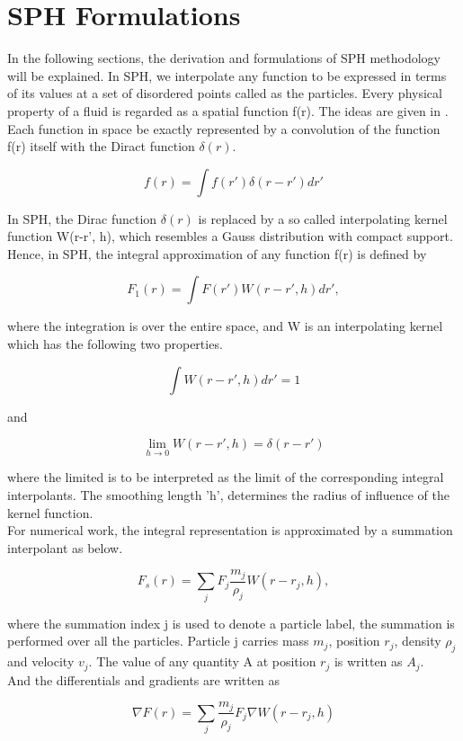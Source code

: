 
\chapter{SPH Formulations}

In the following sections, the derivation and formulations of SPH methodology will be explained. In SPH, we interpolate any function to be expressed in terms of its values at a set of disordered points called as the particles. Every physical property of a fluid is regarded as a spatial function f(r). The ideas are given in \cite{Monaghan1977}. Each function in space be exactly represented by a convolution of the function f(r) itself with the Diract function $\delta (r)$.

\begin{equation}
 f(r) = \int f(r')\delta(r - r')dr'
\end{equation}

In SPH, the Dirac function $\delta (r)$ is replaced by a so called interpolating kernel function W(r-r', h), which resembles a Gauss distribution with compact support. Hence, in SPH, the integral approximation of any function f(r) is defined by

\begin{equation}
 F_1 (r) = \int F(r') W(r-r', h) dr' ,
\end{equation}

\noindent
where the integration is over the entire space, and W is an interpolating kernel which has the following two properties.

\begin{equation}
 \int W(r-r', h)dr' = 1
\end{equation}

\noindent
and 

\begin{equation}
 \lim_{h\to0} W(r-r', h) = \delta(r-r')
\end{equation}

\noindent
where the limited is to be interpreted as the limit of the corresponding integral interpolants. The smoothing length 'h', determines the radius of influence of the kernel function. \\

For numerical work, the integral representation is approximated by a summation interpolant as below.

\begin{equation}
 F_s (r) = \sum_{j} F_j \frac{m_j}{\rho_j} W(r-r_j, h) ,
\end{equation}

\noindent
where the summation index j is used to denote a particle label, the summation is performed over all the particles. Particle j carries mass $m_j$, position $r_j$, density $\rho_j$ and velocity $v_j$. The value of any quantity A at position $r_j$ is written as $A_j$. \\

\noindent
And the differentials and gradients are written as 

\begin{equation}
 \nabla F(r) = \sum_j \frac{m_j}{\rho_j}F_j \nabla W(r-r_j, h)
\end{equation}

